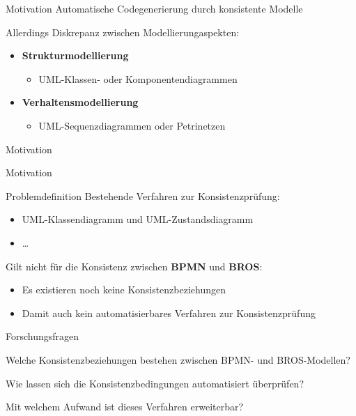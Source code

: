 \begin{frame}{Motivation}
  Automatische Codegenerierung durch konsistente Modelle

  Allerdings Diskrepanz zwischen Modellierungaspekten:

  \begin{itemize}
    \item \textbf{Strukturmodellierung}
    \begin{itemize}
      \item UML-Klassen- oder Komponentendiagrammen 
    \end{itemize}

    \item \textbf{Verhaltensmodellierung}
    \begin{itemize}
      \item UML-Sequenzdiagrammen oder Petrinetzen
    \end{itemize}
  \end{itemize}
\end{frame}
\begin{frame}{Motivation}
  
\end{frame}
\begin{frame}{Motivation}
  
\end{frame}

\begin{frame}{Problemdefinition}
  Bestehende Verfahren zur Konsistenzprüfung:
  \begin{itemize}
    \item UML-Klassendiagramm und UML-Zustandsdiagramm
    
    \item \dots
  \end{itemize}

  Gilt nicht für die Konsistenz zwischen \textbf{BPMN} und \textbf{BROS}:

  \begin{itemize}
    \item Es existieren noch keine Konsistenzbeziehungen

    \item Damit auch kein automatisierbares Verfahren zur Konsistenzprüfung
  \end{itemize}
\end{frame}

\begin{frame}{Forschungsfragen}
  \begin{description}[4cm]
    \item[F1] Welche Konsistenzbeziehungen bestehen zwischen BPMN- und BROS-Modellen?

    \item[F2] Wie lassen sich die Konsistenzbedingungen automatisiert überprüfen?

    \item[F3] Mit welchem Aufwand ist dieses Verfahren erweiterbar?
  \end{description}
\end{frame}

